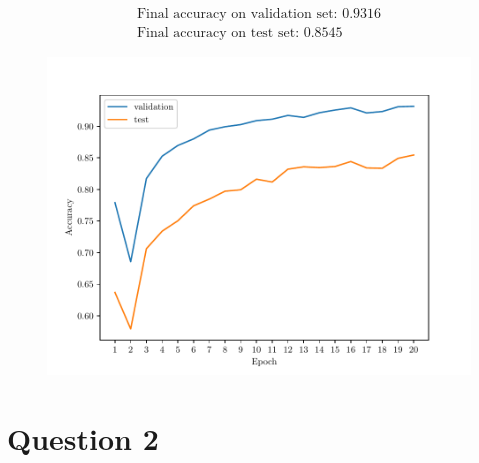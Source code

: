 \documentclass{exam}
\begin{document}
\begin{questions}
\begin{parts}
            \begin{align*}
                \text{Final accuracy on validation set: } 0.9316 \\
                \text{Final accuracy on test set: } 0.8545
            \end{align*}

            \vspace{-2.5em}
            \begin{figure}[H]
                \centering
                \includegraphics[scale = 0.75]{mlp.pdf}
            \end{figure}

        \end{parts}

    \end{questions}

    \section*{Question 2}
\end{document}
